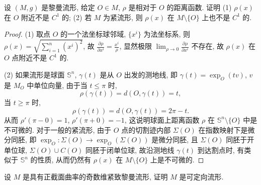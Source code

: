 \begin{exercise}[5]
  设 $(M,g)$ 是黎曼流形, 给定 $O\in M$, $\rho$ 是相对于 $O$ 的距离函数. 证明
  (1) $\rho(x)$ 在 $O$ 附近不是 $C^1$ 的;
  (2) 若 $M$ 为紧流形, 则 $\rho(x)$ 在 $M\setminus\{O\}$ 上也不是 $C^1$ 的.
\end{exercise}

\begin{proof}
  (1) 取点 $O$ 的一个法坐标球邻域, $\{x^i\}$ 为法坐标系, 则
  $\rho(x)=\sqrt{\sum_{i=1}^n (x^i)^2}$, 故 $\frac{\partial\rho}{\partial x^i}=\frac{x^i}{\rho}$,
  显然极限 $\lim_{\rho\to 0}\frac{\partial\rho}{\partial x^i}$ 不存在, 故 $\rho(x)$
  在 $O$ 点附近不是 $C^1$ 的.

  (2) 如果流形是球面 $\mathbb{S}^n$, $\gamma(t)$ 是从 $O$ 出发的测地线,
  即 $\gamma(t)=\exp_O (tv)$, $v$ 是 $M_O$ 中单位向量, 由于当 $t\leq \pi$ 时,
  \[\rho(\gamma(t)) = d(O,\gamma(t)) = t,\]
  当 $t\geq\pi$ 时,
  \[\rho(\gamma(t)) = d(O,\gamma(t)) = 2\pi-t.\]
  从而 $\rho'(\pi-0)=1$, $\rho'(\pi+0)=-1$,
  这说明球面上距离函数 $\rho$ 在 $\mathbb{S}^n\setminus\{O\}$
  中是不可微的. 对于一般的紧流形, 由于 $O$ 点的切割迹内部 $\Sigma(O)$
  在指数映射下是微分同胚, 即 $\exp_O\colon \Sigma(O)\to \exp_O(\Sigma(O))$
  是微分同胚, 且 $\Sigma(O)$ 同胚于开单位球, $\Sigma(O)\cup C(O)$
  同胚于闭单位球, 故沿测地线 $\gamma(t)$ 到达割点时, 有类似于 $\mathbb{S}^n$
  的性质, 从而仍然有 $\rho(x)$ 在 $M\setminus\{O\}$ 上是不可微的.
\end{proof}



\begin{exercise}[6]
  设 $M$ 是具有正截面曲率的奇数维紧致黎曼流形, 证明 $M$ 是可定向流形.
\end{exercise}

